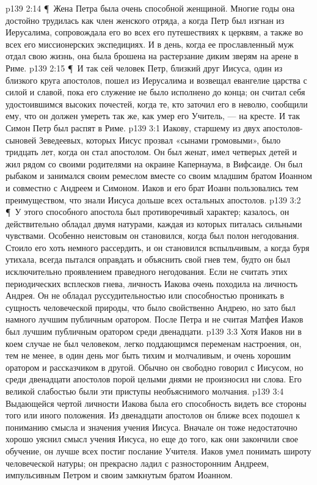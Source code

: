 \vs p139 2:14 \P\ Жена Петра была очень способной женщиной. Многие годы она достойно трудилась как член женского отряда, а когда Петр был изгнан из Иерусалима, сопровождала его во всех его путешествиях к церквям, а также во всех его миссионерских экспедициях. И в день, когда ее прославленный муж отдал свою жизнь, она была брошена на растерзание диким зверям на арене в Риме.
\vs p139 2:15 \P\ И так сей человек Петр, близкий друг Иисуса, один из близкого круга апостолов, пошел из Иерусалима и возвещал евангелие царства с силой и славой, пока его служение не было исполнено до конца; он считал себя удостоившимся высоких почестей, когда те, кто заточил его в неволю, сообщили ему, что он должен умереть так же, как умер его Учитель, --- на кресте. И так Симон Петр был распят в Риме.
\vs p139 3:1 Иакову, старшему из двух апостолов\hyp{}сыновей Зеведеевых, которых Иисус прозвал «сынами громовыми», было тридцать лет, когда он стал апостолом. Он был женат, имел четверых детей и жил рядом со своими родителями на окраине Капернаума, в Вифсаиде. Он был рыбаком и занимался своим ремеслом вместе со своим младшим братом Иоанном и совместно с Андреем и Симоном. Иаков и его брат Иоанн пользовались тем преимуществом, что знали Иисуса дольше всех остальных апостолов.
\vs p139 3:2 \P\ У этого способного апостола был противоречивый характер; казалось, он действительно обладал двумя натурами, каждая из которых питалась сильными чувствами. Особенно неистовым он становился, когда был полон негодования. Стоило его хоть немного рассердить, и он становился вспыльчивым, а когда буря утихала, всегда пытался оправдать и объяснить свой гнев тем, будто он был исключительно проявлением праведного негодования. Если не считать этих периодических всплесков гнева, личность Иакова очень походила на личность Андрея. Он не обладал руссудительностью или способностью проникать в сущность человеческой природы, что было свойственно Андрею, но зато был намного лучшим публичным оратором. После Петра и не считая Матфея Иаков был лучшим публичным оратором среди двенадцати.
\vs p139 3:3 Хотя Иаков ни в коем случае не был человеком, легко поддающимся переменам настроения, он, тем не менее, в один день мог быть тихим и молчаливым, и очень хорошим оратором и рассказчиком в другой. Обычно он свободно говорил с Иисусом, но среди двенадцати апостолов порой целыми днями не произносил ни слова. Его великой слабостью были эти приступы необъяснимого молчания.
\vs p139 3:4 Выдающейся чертой личности Иакова была его способность видеть все стороны того или иного положения. Из двенадцати апостолов он ближе всех подошел к пониманию смысла и значения учения Иисуса. Вначале он тоже недостаточно хорошо уяснил смысл учения Иисуса, но еще до того, как они закончили свое обучение, он лучше всех постиг послание Учителя. Иаков умел понимать широту человеческой натуры; он прекрасно ладил с разносторонним Андреем, импульсивным Петром и своим замкнутым братом Иоанном.
